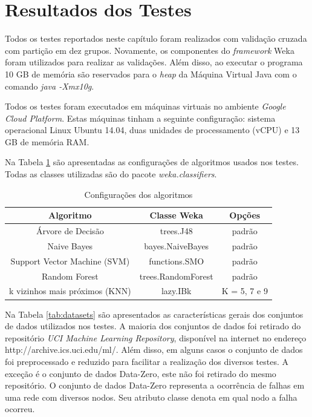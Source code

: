 \section{Resultados dos Testes}

Todos os testes reportados neste capítulo foram realizados com validação cruzada com partição em dez grupos.
Novamente, os componentes do \textit{framework} Weka foram utilizados para realizar as validações.
Além disso, ao executar o programa 10 GB de memória são reservados para o \textit{heap} da Máquina Virtual Java com o comando \textit{java -Xmx10g}.

Todos os testes foram executados em máquinas virtuais no ambiente \textit{Google Cloud Platform}. 
Estas máquinas tinham a seguinte configuração: sistema operacional Linux Ubuntu 14.04, duas unidades de processamento (vCPU) e 13 GB de memória RAM.

Na Tabela \ref{tab:algoritmostestes} são apresentadas as configurações de algoritmos usados nos testes. Todas as classes utilizadas são do pacote \textit{weka.classifiers}.

\begin{table}[h!]
  \begin{center}
    \begin{tabular}{ccc}
      \hline
      \textbf{Algoritmo} & \textbf{Classe Weka} & \textbf{Opções} \\
      \hline

      Árvore de Decisão & trees.J48 & padrão \\
      Naive Bayes & bayes.NaiveBayes & padrão \\
      Support Vector Machine (SVM) & functions.SMO & padrão \\
      Random Forest & trees.RandomForest & padrão \\
      k vizinhos mais próximos (KNN) & lazy.IBk & K = 5, 7 e 9 \\

      \hline
    \end{tabular}
    \caption{Configurações dos algoritmos}
    \label{tab:algoritmostestes}
  \end{center}
\end{table}

Na Tabela \ref{tab:datasets} são apresentados as características gerais dos conjuntos de dados utilizados nos testes.
A maioria dos conjuntos de dados foi retirado do repositório \textit{UCI Machine Learning Repository}, disponível na internet no endereço http://archive.ics.uci.edu/ml/.
Além disso, em alguns casos o conjunto de dados foi preprocessado e reduzido para facilitar a realização dos diversos testes.
A exceção é o conjunto de dados Data-Zero, este não foi retirado do mesmo repositório.
O conjunto de dados Data-Zero representa a ocorrência de falhas em uma rede com diversos nodos.
Seu atributo classe denota em qual nodo a falha ocorreu.

